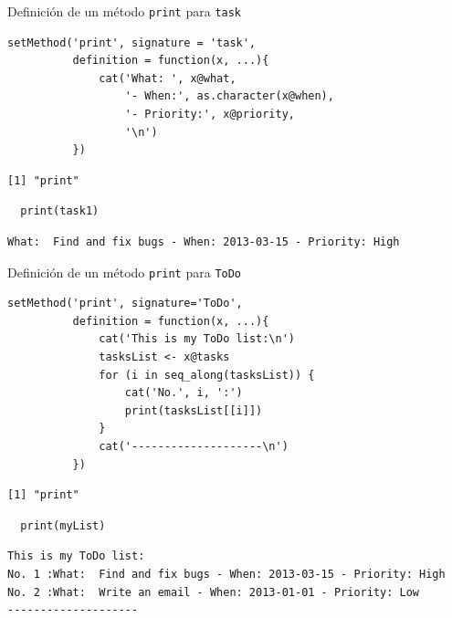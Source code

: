 \documentclass[xcolor={usenames,svgnames,dvipsnames}]{beamer}
\begin{document}
\begin{frame}[fragile,label={sec:org11e26bb}]{Definición de un método \texttt{print} para \texttt{task}}
 \lstset{language=r,label= ,caption= ,captionpos=b,numbers=none}
\begin{lstlisting}
setMethod('print', signature = 'task',
          definition = function(x, ...){
              cat('What: ', x@what,
                  '- When:', as.character(x@when),
                  '- Priority:', x@priority,
                  '\n')
          })
\end{lstlisting}

\begin{verbatim}
[1] "print"
\end{verbatim}


\lstset{language=r,label= ,caption= ,captionpos=b,numbers=none}
\begin{lstlisting}
  print(task1)
\end{lstlisting}

\begin{verbatim}
What:  Find and fix bugs - When: 2013-03-15 - Priority: High
\end{verbatim}
\end{frame}

\begin{frame}[fragile,label={sec:org7cf0dd8}]{Definición de un método \texttt{print} para \texttt{ToDo}}
 \lstset{language=r,label= ,caption= ,captionpos=b,numbers=none}
\begin{lstlisting}
setMethod('print', signature='ToDo',
          definition = function(x, ...){
              cat('This is my ToDo list:\n')
              tasksList <- x@tasks
              for (i in seq_along(tasksList)) {
                  cat('No.', i, ':')
                  print(tasksList[[i]])
              }
              cat('--------------------\n')
          })
\end{lstlisting}

\begin{verbatim}
[1] "print"
\end{verbatim}

\lstset{language=r,label= ,caption= ,captionpos=b,numbers=none}
\begin{lstlisting}
  print(myList)
\end{lstlisting}

\begin{verbatim}
This is my ToDo list:
No. 1 :What:  Find and fix bugs - When: 2013-03-15 - Priority: High 
No. 2 :What:  Write an email - When: 2013-01-01 - Priority: Low 
--------------------
\end{verbatim}
\end{frame}
\end{document}
